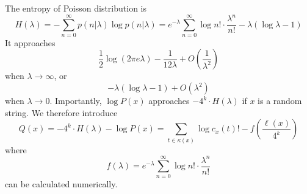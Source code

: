 \documentclass[10pt]{article}
\begin{document}

The entropy of Poisson distribution is
$$
H(\lambda)=-\sum_{n=0}^\infty p(n|\lambda)\log p(n|\lambda)
=e^{-\lambda}\sum_{n=0}^\infty\log n!\cdot\frac{\lambda^n}{n!}-\lambda(\log\lambda-1)
$$
It approaches 
$$
\frac{1}{2}\log(2\pi e\lambda)-\frac{1}{12\lambda}+O\left(\frac{1}{\lambda^2}\right)
$$
when $\lambda\to\infty$, or
$$
-\lambda(\log\lambda-1)+O(\lambda^2)
$$
when $\lambda\to0$.
Importantly, $\log P(x)$ approaches $-4^k\cdot H(\lambda)$ if $x$ is a random string.
We therefore introduce
$$
Q(x)=-4^k\cdot H(\lambda)-\log P(x)=\sum_{t\in\kappa(x)}\log c_x(t)!-f\left(\frac{\ell(x)}{4^k}\right)
$$
where
$$
f(\lambda)=e^{-\lambda}\sum_{n=0}^\infty\log n!\cdot\frac{\lambda^n}{n!}
$$
can be calculated numerically.
\end{document}
